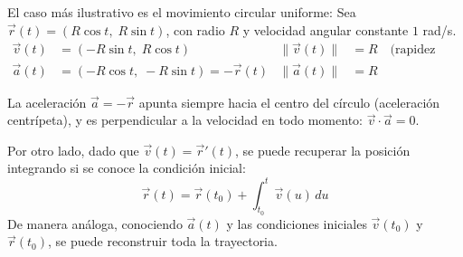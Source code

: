 El caso más ilustrativo es el movimiento circular uniforme: Sea $\vec{r}(t) = (R\cos t,\; R\sin t)$, con radio $R$ y velocidad angular constante $1$ rad/s.
\begin{align*}
    \vec{v}(t) &= (-R\sin t,\; R\cos t) & \|\vec{v}(t)\| &= R \quad \text{(rapidez constante)} \\
    \vec{a}(t) &= (-R\cos t,\; -R\sin t) = -\vec{r}(t) & \|\vec{a}(t)\| &= R
\end{align*}

\begin{center}
\shorthandoff{>}
\end{center}

La aceleración $\vec{a} = -\vec{r}$ apunta siempre hacia el centro del círculo (aceleración centrípeta), y es perpendicular a la velocidad en todo momento: $\vec{v} \cdot \vec{a} = 0$.

Por otro lado, dado que $\vec{v}(t) = \vec{r}'(t)$, se puede recuperar la posición integrando si se conoce la condición inicial:
\[ \vec{r}(t) = \vec{r}(t_0) + \int_{t_0}^{t} \vec{v}(u)\, du \]
De manera análoga, conociendo $\vec{a}(t)$ y las condiciones iniciales $\vec{v}(t_0)$ y $\vec{r}(t_0)$, se puede reconstruir toda la trayectoria.

